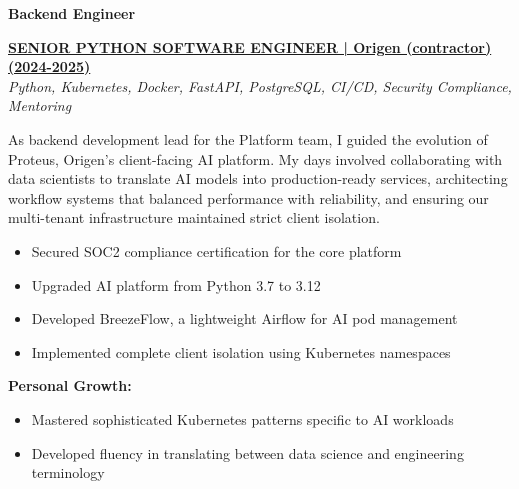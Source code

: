 \documentclass[a4paper,10pt]{article}
\begin{document}
\vspace{0.5cm}
\noindent
{%
	\begin{minipage}{\dimexpr\textwidth-2\fboxsep\relax}
		\vspace{0.2cm}

		{\large\bfseries\color{darkblue}\selectfont Backend Engineer}
		\vspace{0.3cm}

        \noindent\uline{\textbf{SENIOR PYTHON SOFTWARE ENGINEER | Origen (contractor) (2024-2025)}} \\
		\vspace{0.1cm}
		{\small\textit{Python, Kubernetes, Docker, FastAPI, PostgreSQL, CI/CD, Security Compliance, Mentoring}}
		\vspace{0.2cm}

		As backend development lead for the Platform team, I guided the evolution of Proteus, Origen's client-facing AI platform. My days involved collaborating with data scientists to translate AI models into production-ready services, architecting workflow systems that balanced performance with reliability, and ensuring our multi-tenant infrastructure maintained strict client isolation.

		\vspace{0.2cm}
		\begin{itemize}[label=\textcolor{darkblue}{\textbullet}, leftmargin=*, nosep]
			\item Secured SOC2 compliance certification for the core platform
			\item Upgraded AI platform from Python 3.7 to 3.12
			\item Developed BreezeFlow, a lightweight Airflow for AI pod management
			\item Implemented complete client isolation using Kubernetes namespaces
		\end{itemize}

		\vspace{0.2cm}
		\textbf{Personal Growth:}
		\vspace{0.2cm}
		\begin{itemize}[label=\textcolor{darkblue}{\textbullet}, leftmargin=*, nosep]
			\item Mastered sophisticated Kubernetes patterns specific to AI workloads
			\item Developed fluency in translating between data science and engineering terminology
		\end{itemize}


\end{minipage}}
\end{document}
